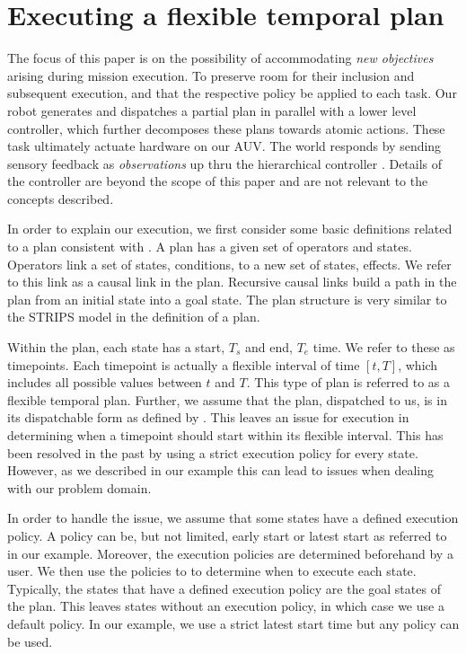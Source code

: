 \section{Executing a flexible temporal plan}
\label{sec: defs}

The focus of this paper is on the possibility of accommodating \emph{new
  objectives} arising during mission execution. 
To preserve room for their inclusion and subsequent execution, and
that the respective policy be applied to each task. Our robot generates and
dispatches a partial plan in parallel with a lower level controller,
which further decomposes these plans towards atomic actions. These
task ultimately actuate hardware on our AUV. The world responds by
sending sensory feedback as \emph{observations} up thru the
hierarchical controller \cite{mcgann08bdup,rajan12dup}. Details of the
controller are beyond the scope of this paper and are not relevant to the
concepts described. 

In order to explain our execution, we first consider some basic definitions related to a plan
consistent with \cite{Nau:2004}. A plan has a given set of operators and states.
Operators link a set of states, conditions, to a new set of states, effects. We 
refer to this link as a causal link in the plan. Recursive causal links build a path
in the plan from an initial state into a goal state. The plan structure is very similar to the
STRIPS model in the definition of a plan. 

Within the plan, each state has a start, $T_s$ and end, $T_e$ time. We refer to
these as timepoints. Each timepoint is actually a flexible interval of time $[t, T]$, which
includes all possible values between $t$ and $T$.  This type of plan is referred to as 
a flexible temporal plan. Further, we assume that the
plan, dispatched to us, is in its dispatchable form as defined by \cite{mus98a}.  This leaves an issue 
for execution in determining when a timepoint should start within its flexible interval. This has been
resolved in the past by using a strict execution policy for every state. However, as we described in our
example this can lead to issues when dealing with our problem domain.

In order to handle the issue, we assume that some states have a defined execution policy. 
A policy can be, but not limited, early start or latest start as referred to in our example.  Moreover, the
execution policies are determined beforehand by a user. We then use the policies to 
to determine when to execute each state. Typically, the states that have a defined
execution policy are the goal states of the plan. This leaves states without an execution policy,
in which case we use a default policy. In our example, we use a strict latest start time but any policy can 
be used. 


